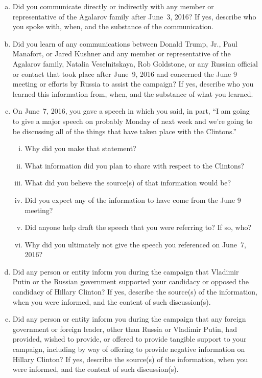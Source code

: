 \begin{enumerate}[a.]
\item Did you communicate directly or indirectly with any member or representative of the Agalarov family after June~3, 2016?
If yes, describe who you spoke with, when, and the substance of the communication.

\item Did you learn of any communications between Donald Trump, Jr., Paul Manafort, or Jared Kushner and any member or representative of the Agalarov family, Natalia Veselnitskaya, Rob Goldstone, or any Russian official or contact that took place after June~9, 2016 and concerned the June 9 meeting or efforts by Russia to assist the campaign?
If yes, describe who you learned this information from, when, and the substance of what you learned.

\item On June~7, 2016, you gave a speech in which you said, in part, ``I am going to give a major speech on probably Monday of next week and we're going to be discussing all of the things that have taken place with the Clintons.''

\begin{enumerate}[i.]

\item Why did you make that statement?
\item What information did you plan to share with respect to the Clintons?
\item What did you believe the source(s) of that information would be?
\item Did you expect any of the information to have come from the June 9 meeting?
\item Did anyone help draft the speech that you were referring to? If so, who?
\item Why did you ultimately not give the speech you referenced on June~7, 2016?

\end{enumerate}

\item Did any person or entity inform you during the campaign that Vladimir Putin or the Russian government supported your candidacy or opposed the candidacy of Hillary Clinton?
If yes, describe the source(s) of the information, when you were informed, and the content of such discussion(s).

\item Did any person or entity inform you during the campaign that any foreign government or foreign leader, other than Russia or Vladimir Putin, had provided, wished to provide, or offered to provide tangible support to your campaign, including by way of offering to provide negative information on Hillary Clinton?
If yes, describe the source(s) of the information, when you were informed, and the content of such discussion(s).

\end{enumerate}

